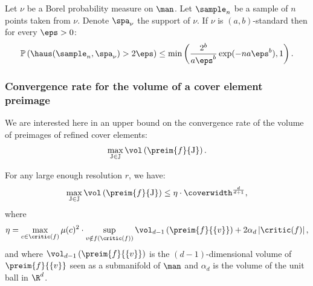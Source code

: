  \begin{theorem}\label{thm:ab}
 Let $\nu$ be a Borel probability measure on $\man$. Let $\sample_n$ be a sample of $n$ points taken from $\nu$. Denote $\spa_\nu$ the support of $\nu$. 
 If $\nu$ is $(a,b)$-standard then for every $\eps>0$:
 $$\mathbb{P}\left(\haus(\sample_n,\spa_\nu)>2\eps\right)\leq\min\left(\frac{2^b}{a\eps^b}\exp(-na\eps^b),1\right).$$
 \end{theorem}

\subsubsection{Convergence rate for the volume of a cover element preimage}
We are interested here in an upper bound on the convergence rate of the volume of preimages of refined cover elements:
$$\max_{\mathrm{J}\in\mathbb{J}}\vol\left( \preim{f}{\mathrm{J}}\right).$$
\begin{lemma}\label{lem:meas}
For any large enough resolution $r$, we have:
$$\max_{\mathrm{J}\in\mathbb{J}}\vol\left( \preim{f}{\mathrm{J}}\right)\leq \eta\cdot\coverwidth^{\frac{d}{d+1}},$$
where
$$\eta=\max_{c\in\critic(f)}\mu(c)^2\cdot\sup_{v\notin f(\critic(f))}\vol_{d-1}\left(\preim{f}{\{v\}}\right)+2\alpha_d\left|\critic(f)\right|,$$
and where $\vol_{d-1}\left(\preim{f}{\{v\}}\right)$ is the $(d-1)$-dimensional volume of $\preim{f}{\{v\}}$ seen as a submanifold of $\man$ and $\alpha_d$ is the volume of the unit ball in $\R^d$.

\end{lemma}
